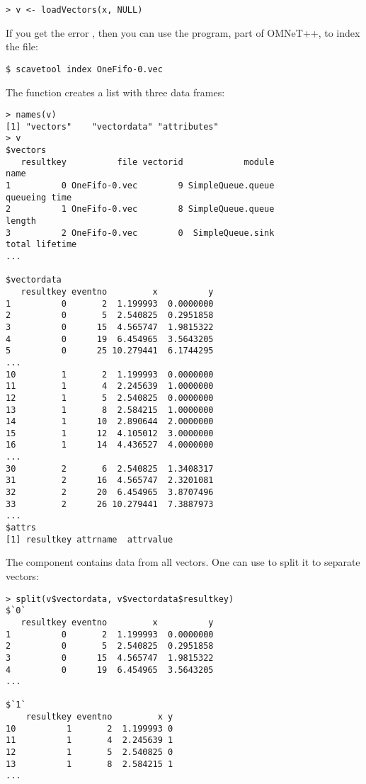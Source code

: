 \begin{verbatim}
> v <- loadVectors(x, NULL)
\end{verbatim}

If you get the error , then
you can use the  program, part of OMNeT++, to index the file:

\begin{verbatim}
$ scavetool index OneFifo-0.vec
\end{verbatim}

The  function creates a list with three data frames:

\begin{verbatim}
> names(v)
[1] "vectors"    "vectordata" "attributes"
> v
$vectors
   resultkey          file vectorid            module                          name
1          0 OneFifo-0.vec        9 SimpleQueue.queue                 queueing time
2          1 OneFifo-0.vec        8 SimpleQueue.queue                        length
3          2 OneFifo-0.vec        0  SimpleQueue.sink                total lifetime
...

$vectordata
   resultkey eventno         x          y
1          0       2  1.199993  0.0000000
2          0       5  2.540825  0.2951858
3          0      15  4.565747  1.9815322
4          0      19  6.454965  3.5643205
5          0      25 10.279441  6.1744295
...
10         1       2  1.199993  0.0000000
11         1       4  2.245639  1.0000000
12         1       5  2.540825  0.0000000
13         1       8  2.584215  1.0000000
14         1      10  2.890644  2.0000000
15         1      12  4.105012  3.0000000
16         1      14  4.436527  4.0000000
...
30         2       6  2.540825  1.3408317
31         2      16  4.565747  2.3201081
32         2      20  6.454965  3.8707496
33         2      26 10.279441  7.3887973
...
$attrs
[1] resultkey attrname  attrvalue
\end{verbatim}

The  component contains data from all vectors.
One can use  to split it to separate vectors:

\begin{verbatim}
> split(v$vectordata, v$vectordata$resultkey)
$`0`
   resultkey eventno         x          y
1          0       2  1.199993  0.0000000
2          0       5  2.540825  0.2951858
3          0      15  4.565747  1.9815322
4          0      19  6.454965  3.5643205
...

$`1`
    resultkey eventno         x y
10          1       2  1.199993 0
11          1       4  2.245639 1
12          1       5  2.540825 0
13          1       8  2.584215 1
...
\end{verbatim}

